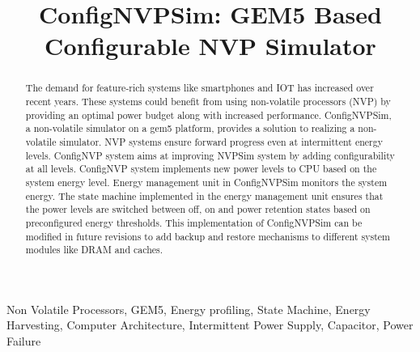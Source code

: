 \documentclass[conference]{IEEEtran}
\begin{document}
\title{ConfigNVPSim: GEM5 Based Configurable NVP Simulator\\
}

\author{
\and
{}
\and
{}
}

\maketitle

\begin{abstract}
The demand for feature-rich systems like smartphones and IOT has increased over recent years. These systems could benefit from using non-volatile processors (NVP) by providing an optimal power budget along with increased performance. ConfigNVPSim, a non-volatile simulator on a gem5 platform, provides a solution to realizing a non-volatile simulator. NVP systems ensure forward progress even at intermittent energy levels. ConfigNVP system aims at improving NVPSim \cite{b1} system by adding configurability at all levels. ConfigNVP system implements new power levels to CPU based on the system energy level. Energy management unit in ConfigNVPSim monitors the system energy. The state machine implemented in the energy management unit ensures that the power levels are switched between off, on and power retention states based on preconfigured energy thresholds. This implementation of ConfigNVPSim can be modified in future revisions to add backup and restore mechanisms to different system modules like DRAM and caches.   
\end{abstract}
\vspace{5 mm}
\begin{IEEEkeywords}
Non Volatile Processors, GEM5, Energy profiling, State Machine, Energy Harvesting, Computer Architecture, Intermittent Power Supply, Capacitor, Power Failure
\end{IEEEkeywords}
\end{document}
